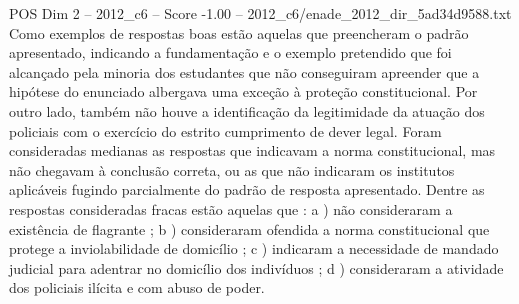\begin{textsample}{POS Dim 2 – 2012\_c6 – Score -1.00 – 2012\_c6/enade\_2012\_dir\_5ad34d9588.txt}
Como exemplos de respostas boas estão aquelas que preencheram o padrão apresentado, indicando a fundamentação e o exemplo pretendido que foi alcançado pela minoria dos estudantes que não conseguiram apreender que a hipótese do enunciado albergava uma exceção à proteção constitucional.
Por outro lado, também não houve a identificação da legitimidade da atuação dos policiais com o exercício do estrito cumprimento de dever legal.
Foram consideradas medianas as respostas que indicavam a norma constitucional, mas não chegavam à conclusão correta, ou as que não indicaram os institutos aplicáveis fugindo parcialmente do padrão de resposta apresentado.
Dentre as respostas consideradas fracas estão aquelas que : a ) não consideraram a existência de flagrante ; b ) consideraram ofendida a norma constitucional que protege a inviolabilidade de domicílio ; c ) indicaram a necessidade de mandado judicial para adentrar no domicílio dos indivíduos ; d ) consideraram a atividade dos policiais ilícita e com abuso de poder.

\end{textsample}
